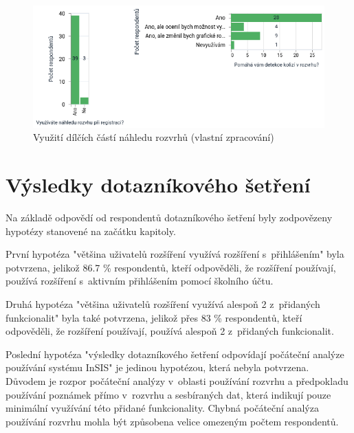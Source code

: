 \begin{figure}[htbp!]\centering
    \includegraphics[width=\textwidth]{img/previews-visualization.png}
    \caption{Využití dílčích částí náhledu rozvrhů (vlastní zpracování)}
    \label{fig:nahledy-vizualizace}
\end{figure}

\section{Výsledky dotazníkového šetření}

Na základě odpovědí od respondentů dotazníkového šetření byly zodpovězeny hypotézy stanovené na začátku kapitoly.

První hypotéza "většina uživatelů rozšíření využívá rozšíření s~přihlášením" byla potvrzena, jelikož 86.7 \% respondentů, kteří odpověděli, že rozšíření používají, používá rozšíření s~aktivním přihlášením pomocí školního účtu.

Druhá hypotéza "většina uživatelů rozšíření využívá alespoň 2 z~přidaných funkcionalit" byla také potvrzena, jelikož přes 83 \% respondentů, kteří odpověděli, že rozšíření používají, používá alespoň 2 z~přidaných funkcionalit.

Poslední hypotéza "výsledky dotazníkového šetření odpovídají počáteční analýze používání systému InSIS" je jedinou hypotézou, která nebyla potvrzena. Důvodem je rozpor počáteční analýzy v~oblasti používání rozvrhu a předpokladu používání poznámek přímo v~rozvrhu a sesbíraných dat, která indikují pouze minimální využívání této přidané funkcionality. Chybná počáteční analýza používání rozvrhu mohla být způsobena velice omezeným počtem respondentů.
